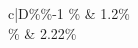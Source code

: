 \documentclass{article}
\begin{document}
\begin{tabular}{c|D{\%}{\%}{-1}}
\% & 1.2\% \\\% & 2.22\% \\\hline
\end{tabular}
\end{document}
